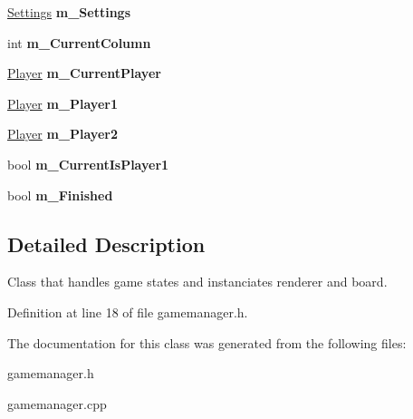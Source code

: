 \begin{DoxyCompactItemize}
\item 
\hypertarget{class_game_manager_a333d215d519fe0789a64c369bdb7a4ee}{\hyperlink{struct_settings}{Settings} {\bfseries m\-\_\-\-Settings}}\label{class_game_manager_a333d215d519fe0789a64c369bdb7a4ee}

\item 
\hypertarget{class_game_manager_a85d58e6dbc954f0441fb5fdb8c797564}{int {\bfseries m\-\_\-\-Current\-Column}}\label{class_game_manager_a85d58e6dbc954f0441fb5fdb8c797564}

\item 
\hypertarget{class_game_manager_a266242aba3c8f5a98b79bd48bf257a5d}{\hyperlink{class_player}{Player} {\bfseries m\-\_\-\-Current\-Player}}\label{class_game_manager_a266242aba3c8f5a98b79bd48bf257a5d}

\item 
\hypertarget{class_game_manager_a354706b4266f9720a284402a2c22b060}{\hyperlink{class_player}{Player} {\bfseries m\-\_\-\-Player1}}\label{class_game_manager_a354706b4266f9720a284402a2c22b060}

\item 
\hypertarget{class_game_manager_a53dc81fe5edc0284d9e15557494d5f17}{\hyperlink{class_player}{Player} {\bfseries m\-\_\-\-Player2}}\label{class_game_manager_a53dc81fe5edc0284d9e15557494d5f17}

\item 
\hypertarget{class_game_manager_aa352a1a6b760aefdc1c21065eb5e1c5b}{bool {\bfseries m\-\_\-\-Current\-Is\-Player1}}\label{class_game_manager_aa352a1a6b760aefdc1c21065eb5e1c5b}

\item 
\hypertarget{class_game_manager_a4357ddc5393953e39d5b217103e85f63}{bool {\bfseries m\-\_\-\-Finished}}\label{class_game_manager_a4357ddc5393953e39d5b217103e85f63}

\end{DoxyCompactItemize}


\subsection{Detailed Description}
Class that handles game states and instanciates renderer and board. 

Definition at line 18 of file gamemanager.\-h.



The documentation for this class was generated from the following files\-:\begin{DoxyCompactItemize}
\item 
gamemanager.\-h\item 
gamemanager.\-cpp\end{DoxyCompactItemize}
